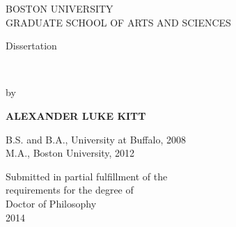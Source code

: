 \begin{titlepage}   %
\begin{center}

  BOSTON UNIVERSITY\\
  GRADUATE SCHOOL OF ARTS AND SCIENCES\\

  \vspace{0.57in}

  Dissertation\\

  \vspace{0.57in}

  \textbf{\thesistitle}\\

  \vspace{0.43in}

  by\\

  \vspace{0.43in}

  {\bf ALEXANDER LUKE KITT}\\

  \vspace{0.43in}

  \begin{singlespace}
    B.S. and B.A., University at Buffalo, 2008\\
    M.A., Boston University, 2012\\
  \end{singlespace}

  \vfill

  Submitted in partial fulfillment of the\\
  requirements for the degree of\\
  Doctor of Philosophy\\
  2014\\

\end{center}
\end{titlepage}